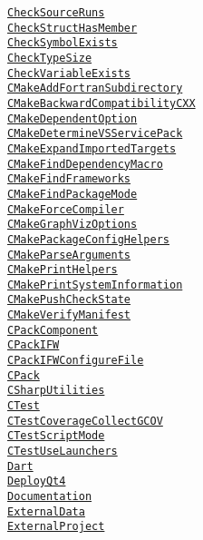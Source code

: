 \documentclass{article}
\newcommand{\cmakemodule}[1]{{\href{https://cmake.org/cmake/help/v3.20/module/#1.html}{{\lstinline{#1}}}}}
\begin{document}
\begin{minipage}[t]{0.18\linewidth}
\cmakemodule{CheckSourceRuns}\\
\cmakemodule{CheckStructHasMember}\\
\cmakemodule{CheckSymbolExists}\\
\cmakemodule{CheckTypeSize}\\
\cmakemodule{CheckVariableExists}\\
\cmakemodule{CMakeAddFortranSubdirectory}\\
\cmakemodule{CMakeBackwardCompatibilityCXX}\\
\cmakemodule{CMakeDependentOption}\\
\cmakemodule{CMakeDetermineVSServicePack}\\
\cmakemodule{CMakeExpandImportedTargets}\\
\cmakemodule{CMakeFindDependencyMacro}\\
\cmakemodule{CMakeFindFrameworks}\\
\cmakemodule{CMakeFindPackageMode}\\
\cmakemodule{CMakeForceCompiler}\\
\cmakemodule{CMakeGraphVizOptions}\\
\cmakemodule{CMakePackageConfigHelpers}\\
\cmakemodule{CMakeParseArguments}\\
\cmakemodule{CMakePrintHelpers}\\
\cmakemodule{CMakePrintSystemInformation}\\
\cmakemodule{CMakePushCheckState}\\
\cmakemodule{CMakeVerifyManifest}\\
\cmakemodule{CPackComponent}\\
\cmakemodule{CPackIFW}\\
\cmakemodule{CPackIFWConfigureFile}\\
\cmakemodule{CPack}\\
\cmakemodule{CSharpUtilities}\\
\cmakemodule{CTest}\\
\cmakemodule{CTestCoverageCollectGCOV}\\
\cmakemodule{CTestScriptMode}\\
\cmakemodule{CTestUseLaunchers}\\
\cmakemodule{Dart}\\
\cmakemodule{DeployQt4}\\
\cmakemodule{Documentation}\\
\cmakemodule{ExternalData}\\
\cmakemodule{ExternalProject}\\

\end{minipage}
\end{document}

